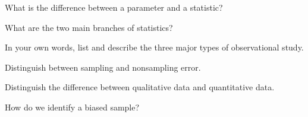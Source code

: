 \begin{problem} 
What is the difference between a parameter and a statistic?
\end{problem}

\begin{problem} 
What are the two main branches of statistics?
\end{problem}

\begin{problem} 
In your own words, list and describe the three major types of observational study.
\end{problem}

\begin{problem} 
Distinguish between sampling and nonsampling error.
\end{problem}

\begin{problem} 
Distinguish the difference between qualitative data and quantitative data.
\end{problem}

\begin{problem} 
How do we identify a biased sample?
\end{problem} 

% 
% 
